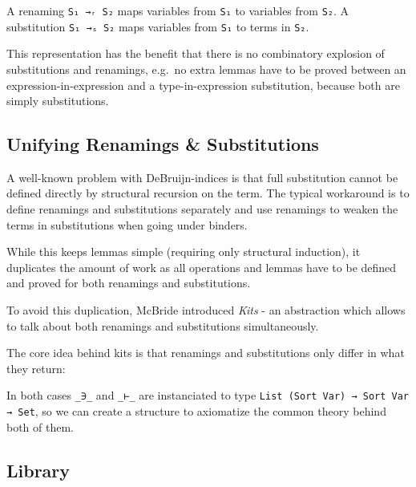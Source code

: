 \documentclass[sigplan,10pt]{acmart}
\newenvironment{LibCode*}{%
  \begin{tcolorbox}[%
    colframe=white,%
    boxrule=0.0pt,%
    top=2.5pt,%
    left=2.5pt,%
    bottom=2.5pt,%
    right=2.5pt,%
    boxsep=0pt%
  ]\vspace{-0.2\baselineskip}%
}{%
  \vspace{-1\baselineskip}%
  \end{tcolorbox}%
}
\newenvironment{ExampleCode*}{%
  \begin{tcolorbox}[%
    colframe=white,%
    colback=yellow!5,%
    boxrule=0.0pt,%
    top=2.5pt,%
    left=2.5pt,%
    bottom=2.5pt,%
    right=2.5pt,%
    boxsep=0pt%
  ]\vspace{-0.2\baselineskip}%
}{%
  \vspace{-1\baselineskip}%
  \end{tcolorbox}%
}
\newcommand*\LibCode[1]{\begin{LibCode*}{#1}\end{LibCode*}}
\newcommand*\ExampleCode[1]{\begin{ExampleCode*}{#1}\end{ExampleCode*}}
\begin{document}
  \ExampleCode\FExampleSubRen

  A renaming \texttt{S₁ →ᵣ S₂} maps variables from \texttt{S₁} to
  variables from \texttt{S₂}.
  A substitution \texttt{S₁ →ₛ S₂} maps variables from \texttt{S₁} to
  terms in \texttt{S₂}.

  \ExampleCode\FExampleSub

  This representation has the benefit that there is no combinatory
  explosion of substitutions and renamings, e.g.\ no extra lemmas have to be
  proved between an expression-in-expression and a type-in-expression
  substitution, because both are simply substitutions.

  \subsection{Unifying Renamings \& Substitutions}
  A well-known problem with DeBruijn-indices is that full substitution
  cannot be defined directly by structural recursion on the term.
  The typical workaround is to define renamings and substitutions
  separately and use renamings to weaken the terms in substitutions
  when going under binders.

  While this keeps lemmas simple (requiring only structural induction),
  it duplicates the amount of work as all operations and lemmas have
  to be defined and proved for both renamings and substitutions.

  To avoid this duplication,
  McBride\cite{DBLP:journals/jar/BentonHKM12,
  unpublished:mcbride2005kits} introduced \emph{Kits} - an abstraction
  which allows to talk about both renamings and substitutions
  simultaneously.

  The core idea behind kits is that renamings and substitutions only
  differ in what they return:
  \ExampleCode\FExampleSubRen

  In both cases \texttt{\_∋\_} and \texttt{\_⊢\_} are instanciated to type
  \texttt{List (Sort Var) → Sort Var → Set}, so we can create a structure
  to axiomatize the common theory behind both of them.
  \LibCode\KKit



  \subsection{Library}
  \LibCode\KMap
  \LibCode\KAp
  \LibCode\KExt
  \LibCode\KLift
  \LibCode\KId
  \LibCode\KSingle
  \LibCode\KWeaken
  \LibCode\KEq
  \LibCode\KFunExt
  \LibCode\KIdLift
  \LibCode\KKitNotation
  \LibCode\KTraversal
  \LibCode\KKitInstances
  \LibCode\KKitOpen
\end{document}
